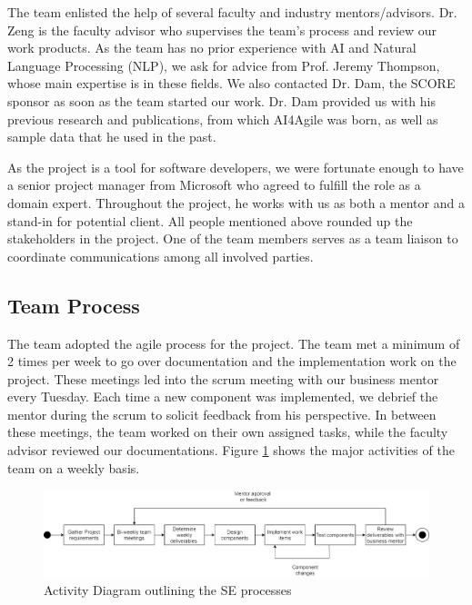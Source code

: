 The team enlisted the help of several faculty and industry mentors/advisors. Dr. Zeng is the faculty advisor who supervises the team's process and review our work products. As the team has no prior experience with AI and Natural Language Processing (NLP), we ask for advice from Prof. Jeremy Thompson, whose main expertise is in these fields. We also contacted Dr. Dam, the SCORE sponsor as soon as the team started our work. Dr. Dam provided us with his previous research and publications, from which AI4Agile was born, as well as sample data that he used in the past. 

As the project is a tool for software developers, we were fortunate enough to have a senior project manager from Microsoft who agreed to fulfill the role as a domain expert. Throughout the project, he works with us as both a mentor and a stand-in for potential client. All people mentioned above rounded up the stakeholders in the project. One of the team members serves as a team liaison to coordinate communications among all involved parties.

\subsection{Team Process}
The team adopted the agile process for the project. The team met a minimum of 2 times per week to go over documentation and the implementation work on the project. These meetings led into the scrum meeting with our business mentor every Tuesday. Each time a new component was implemented, we debrief the mentor during the scrum to solicit feedback from his perspective. In between these meetings, the team worked on their own assigned tasks, while the faculty advisor reviewed our documentations. Figure \ref{fig:acd} shows the major activities of the team on a weekly basis. 

\begin{figure}
\centerline{\includegraphics[width=\textwidth,height=\textheight,keepaspectratio]{./figure/ActivityDiagram.png}}
\caption{Activity Diagram outlining the SE processes}
\label{fig:acd}
\end{figure}\

